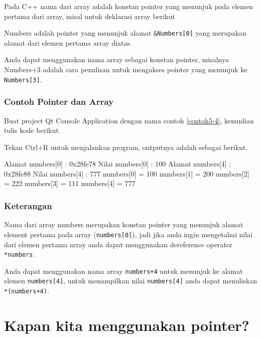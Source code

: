 Pada C++ nama dari array adalah konstan pointer yang menunjuk pada
elemen pertama dari array, misal untuk deklarasi array berikut



Numbers adalah pointer yang menunjuk alamat \texttt{\&Numbers{[}0{]}}
yang merupakan alamat dari elemen pertama array diatas.

Anda dapat menggunakan nama array sebagai konstan pointer, misalnya
Numbers+3 adalah cara penulisan untuk mengakses pointer yang menunjuk ke
\texttt{Numbers{[}3{]}}.

\subsubsection*{Contoh Pointer dan Array}

Buat project Qt Console Application dengan nama contoh \ref{contoh5-4}, kemudian tulis
kode berikut.



Tekan Ctrl+R untuk menjalankan program, outputnya adalah sebagai
berikut.

\begin{lcverbatim}
Alamat numbers[0] : 0x28fe78
Nilai numbers[0] : 100
Alamat numbers[4] : 0x28fe88
Nilai numbers[4] : 777
numbers[0] = 100
numbers[1] = 200
numbers[2] = 222
numbers[3] = 111
numbers[4] = 777
\end{lcverbatim}

\subsubsection*{Keterangan}

Nama dari array numbers merupakan konstan pointer yang menunjuk alamat
element pertama pada array (\texttt{numbers{[}0{]}}), jadi jika anda
ingin mengetahui nilai dari elemen pertama array anda dapat menggunakan
dereference operator \texttt{*numbers}.

Anda dapat menggunakan nama array \texttt{numbers+4} untuk menunjuk ke
alamat elemen \texttt{numbers{[}4{]}}, untuk menampilkan nilai
\texttt{numbers{[}4{]}} anda dapat menuliskan \texttt{*(numbers+4)}.

\section{Kapan kita menggunakan pointer?}\label{kapan-kita-menggunakan-pointer}


